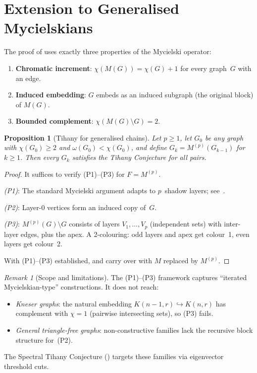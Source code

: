 \documentclass[11pt]{amsart}
\newtheorem{proposition}[theorem]{Proposition}
\theoremstyle{definition}
\theoremstyle{remark}
\newtheorem{remark}[theorem]{Remark}
\begin{document}
\section{Extension to Generalised Mycielskians}\label{sec:generalised}

The proof of  uses exactly three properties 
of the Mycielski operator:

\begin{enumerate}[label=(P\arabic*)]
\item \textbf{Chromatic increment}: $\chi(M(G)) = \chi(G) + 1$ for 
  every graph~$G$ with an edge.
\item \textbf{Induced embedding}: $G$ embeds as an induced subgraph 
  (the original block) of $M(G)$.
\item \textbf{Bounded complement}: $\chi(M(G) \setminus G) = 2$.
\end{enumerate}

\begin{proposition}[Tihany for generalised chains]\label{prop:generalised}
Let $p \ge 1$, let $G_0$ be any graph with $\chi(G_0) \ge 2$ and 
$\omega(G_0) < \chi(G_0)$, and define $G_k = M^{(p)}(G_{k-1})$ 
for $k \ge 1$.  Then every $G_k$ satisfies the Tihany Conjecture 
for all pairs.
\end{proposition}

\begin{proof}
It suffices to verify (P1)--(P3) for $F = M^{(p)}$.

\emph{(P1)}: The standard Mycielski argument adapts to $p$~shadow 
layers; see~\cite{lin-wu-lam-gu-2006}.

\emph{(P2)}: Layer-0 vertices form an induced copy of~$G$.

\emph{(P3)}: $M^{(p)}(G) \setminus G$ consists of layers 
$V_1, \ldots, V_p$ (independent sets) with inter-layer edges, plus 
the apex.  A 2-colouring: odd layers and apex get colour~1, even layers 
get colour~2.

With (P1)--(P3) established,  and 
 carry over with $M$ replaced by $M^{(p)}$.
\end{proof}

\begin{remark}[Scope and limitations]\label{rmk:scope}
The (P1)--(P3) framework captures ``iterated Mycielskian-type'' 
constructions.  It does not reach:
\begin{itemize}
\item \emph{Kneser graphs}: the natural embedding 
  $K(n{-}1,r) \hookrightarrow K(n,r)$ has complement with 
  $\chi = 1$ (pairwise intersecting sets), so (P3) fails.
\item \emph{General triangle-free graphs}: non-constructive families 
  lack the recursive block structure for~(P2).
\end{itemize}
The Spectral Tihany Conjecture () targets 
these families via eigenvector threshold cuts.
\end{remark}
\end{document}
